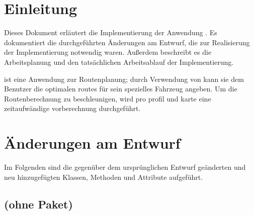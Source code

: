 \documentclass[a4paper, 11pt]{article}
\makeatletter
\def\namedlabel#1#2{\begingroup
    #2%
    \def\@currentlabel{#2}%
    \phantomsection\label{#1}\endgroup
}
\newcommand{\none}[0]{
  \item[] keine.
}
\newcommand{\@typelabel}[1]{T:#1} %
\newcommand{\@paramlabel}[3]{P:#1.#2.#3}
\newcommand{\class}[4]{%
  \newcommand{\currentclass}[0]{#1}%
  \item[\namedlabel{\@typelabel{#1}}{\code{#1}}] #2
    \ifstrequal{#3#4}{\none\none}{%
    }{%
      \begin{description}[leftmargin=0em,itemindent=0em]
        \ifstrequal{#3}{\none}{%
        }{%
        \item[Attribute] \hfill %
          \begin{description}
            #3%
          \end{description}
        }%
        \ifstrequal{#4}{\none}{%
        }{%
        \item[Methoden] \hfill%
          \begin{description}
            #4%
          \end{description}
        }%
      \end{description}
    }%
  \let\currentclass=\undefined%
}
\newcommand{\currentmethod}[0]{#1}%
\let\currentmethod=\undefined%
\newcommand{\param}[3]{%
  \item[\namedlabel{\@paramlabel{\currentclass}{\currentmethod}{#1}}{\code{#1}}] #3 Typ:~\reftype{#2}%
}
\newcommand{\code}[1]{\texttt{#1}}
\makeatother
\begin{document}
\section{Einleitung}
Dieses Dokument erläutert die Implementierung der Anwendung \routeKIT. Es dokumentiert die durchgeführten Änderungen am Entwurf, die zur Realisierung der Implementierung notwendig waren. Außerdem beschreibt es die Arbeitsplanung und den tatsächlichen Arbeitsablauf der Implementierung.

\routeKIT ist eine Anwendung zur Routenplanung; durch Verwendung von  kann sie dem Benutzer die optimalen \glspl{route} für sein spezielles Fahrzeug angeben.
Um die Routenberechnung zu beschleunigen, wird pro \gls{profil} und \gls{karte} eine zeitaufwändige \gls{vorberechnung} durchgeführt.

\section{Änderungen am Entwurf}
Im Folgenden sind die gegenüber dem ursprünglichen Entwurf geänderten und neu hinzugefügten Klassen, Methoden und Attribute aufgeführt.

\subsection{(ohne Paket)}
\end{document}
